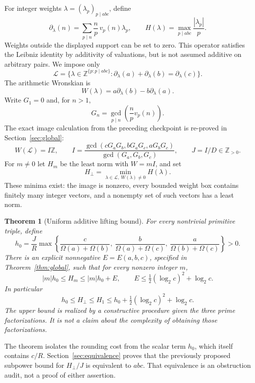 \documentclass[11pt]{article}
\newtheorem{theorem}{Theorem}[section]
\theoremstyle{definition}
\theoremstyle{remark}
\newcommand{\Z}{\mathbb Z}
\newcommand{\Om}{\Omega}
\newcommand{\LL}{\mathcal L}
\begin{document}
For integer weights $\lambda=(\lambda_p)_{p\mid abc}$, define
\begin{equation}\label{eq:derivative}
 \partial_\lambda(n)=\sum_{p\mid n}\frac np\,v_p(n)\lambda_p,
 \qquad
 H(\lambda)=\max_{p\mid abc}\frac{|\lambda_p|}{p}.
\end{equation}
Weights outside the displayed support can be set to zero. This operator satisfies the Leibniz identity by additivity of valuations, but is not assumed additive on arbitrary pairs. We impose only
\[
 \LL=\{\lambda\in\Z^{\{p:p\mid abc\}}:
 \partial_\lambda(a)+\partial_\lambda(b)=\partial_\lambda(c)\}.
\]
The arithmetic Wronskian is
\[
 W(\lambda)=a\partial_\lambda(b)-b\partial_\lambda(a).
\]
Write $G_1=0$ and, for $n>1$,
\[
 G_n=\gcd_{p\mid n}\left(\frac np v_p(n)\right).
\]
The exact image calculation from the preceding checkpoint \cite{normalforms} is re-proved in Section~\ref{sec:global}:
\begin{equation}\label{eq:I}
 W(\LL)=I\Z,\qquad
 I=\frac{\gcd(cG_aG_b,bG_aG_c,aG_bG_c)}{\gcd(G_a,G_b,G_c)},
 \qquad J=I/D\in\Z_{>0}.
\end{equation}
For $m\ne0$ let $H_m$ be the least norm with $W=mI$, and set
\[
 H_\perp=\min_{\lambda\in\LL,\ W(\lambda)\ne0}H(\lambda).
\]
These minima exist: the image is nonzero, every bounded weight box contains finitely many integer vectors, and a nonempty set of such vectors has a least norm.

\begin{theorem}[Uniform additive lifting bound]\label{thm:main}
For every nontrivial primitive triple, define
\begin{equation}\label{eq:h0}
 h_0=\frac JR\max\left\{
 \frac{c}{\Om(a)+\Om(b)},\
 \frac{b}{\Om(a)+\Om(c)},\
 \frac{a}{\Om(b)+\Om(c)}\right\}>0.
\end{equation}
There is an explicit nonnegative $E=E(a,b,c)$, specified in Theorem~\ref{thm:global}, such that for every nonzero integer $m$,
\begin{equation}\label{eq:levelbound}
 |m|h_0\le H_m\le |m|h_0+E,
 \qquad
 E\le\tfrac12(\log_2c)^2+\log_2c.
\end{equation}
In particular
\begin{equation}\label{eq:Hperp}
 h_0\le H_\perp\le H_1\le h_0+\tfrac12(\log_2c)^2+\log_2c.
\end{equation}
The upper bound is realized by a constructive procedure given the three prime factorizations. It is not a claim about the complexity of obtaining those factorizations.
\end{theorem}
The theorem isolates the rounding cost from the scalar term $h_0$, which itself contains $c/R$. Section~\ref{sec:equivalence} proves that the previously proposed subpower bound for $H_\perp/J$ is equivalent to $abc$. That equivalence is an obstruction audit, not a proof of either assertion.
\end{document}

